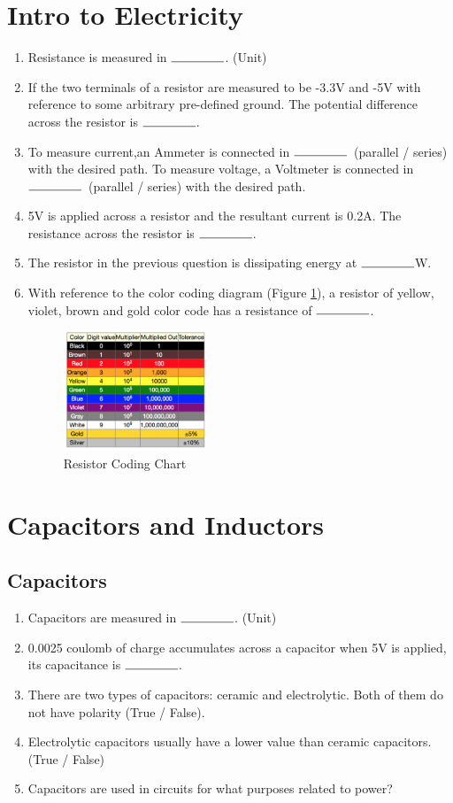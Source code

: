 \documentclass{article}
\newcommand{\ans}{$\rule{1.5cm}{0.15mm}$}
\begin{document}
\section{Intro to Electricity}
\begin{enumerate}
	\item Resistance is measured in \ans. (Unit)
	\item If the two terminals of a resistor are measured to be -3.3V and -5V with reference to some arbitrary pre-defined ground. The potential difference across the resistor is \ans.
	\item To measure current,an Ammeter is connected in \ans\ (parallel / series) with the desired path. To measure voltage, a Voltmeter is connected in \ans\ (parallel / series) with the desired path.
	\item 5V is applied across a resistor and the resultant current is 0.2A. The resistance across the resistor is \ans.
	\item The resistor in the previous question is dissipating energy at \ans W.
	\item With reference to the color coding diagram (Figure \ref{fig:Resistor}), a resistor of yellow, violet, brown and gold color code has a resistance of \ans.
	\begin{figure}
		\center
		\includegraphics[width=0.4\textwidth, keepaspectratio]{rcolorcoding}
		\caption{Resistor Coding Chart}
		\label{fig:Resistor}
	\end{figure}
\end{enumerate}

\section{Capacitors and Inductors}
\subsection{Capacitors}
\begin{enumerate}
	\item Capacitors are measured in \ans. (Unit)
	\item 0.0025 coulomb of charge accumulates across a capacitor when 5V is applied, its capacitance is \ans.
	\item There are two types of capacitors: ceramic and electrolytic. Both of them do not have polarity (True / False).
	\item Electrolytic capacitors usually have a lower value than ceramic capacitors. (True / False)
	\item Capacitors are used in circuits for what purposes related to power?
\end{enumerate}
\end{document}
